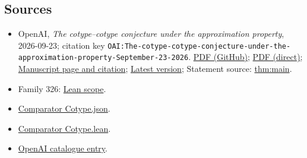 \documentclass[11pt]{article}
\begin{document}
\subsection{Sources}
\begin{itemize}
\item OpenAI, \emph{The cotype–cotype conjecture under the approximation property}, 2026-09-23; citation key \texttt{OAI:The-cotype-cotype-conjecture-under-the-approximation-property-September-23-2026}. \href{https://github.com/openai/math/blob/adc7f1241b42e322a6451854ab7e4b4c146bf78a/preprints/The-cotype-cotype-conjecture-under-the-approximation-property-September-23-2026/paper.pdf}{PDF (GitHub)}; \href{https://github.com/openai/math/raw/adc7f1241b42e322a6451854ab7e4b4c146bf78a/preprints/The-cotype-cotype-conjecture-under-the-approximation-property-September-23-2026/paper.pdf}{PDF (direct)}; \href{https://github.com/openai/math/blob/adc7f1241b42e322a6451854ab7e4b4c146bf78a/preprints/The-cotype-cotype-conjecture-under-the-approximation-property-September-23-2026/README.md}{Manuscript page and citation}; \href{https://github.com/openai/math/blob/main/preprints/The-cotype-cotype-conjecture-under-the-approximation-property-September-23-2026/paper.pdf}{Latest version}; Statement source: \href{https://github.com/openai/math/blob/adc7f1241b42e322a6451854ab7e4b4c146bf78a/preprints/The-cotype-cotype-conjecture-under-the-approximation-property-September-23-2026/build/introduction.tex\#L43}{thm:main}.
\item Family 326: \href{https://github.com/openai/math/blob/adc7f1241b42e322a6451854ab7e4b4c146bf78a/lean/docs/326.md}{Lean scope}.
\item \href{https://github.com/openai/math/blob/adc7f1241b42e322a6451854ab7e4b4c146bf78a/lean/ComparatorChallenges/Cotype.json}{Comparator Cotype.json}.
\item \href{https://github.com/openai/math/blob/adc7f1241b42e322a6451854ab7e4b4c146bf78a/lean/ComparatorChallenges/Cotype.lean}{Comparator Cotype.lean}.
\item \href{https://github.com/openai/math/blob/adc7f1241b42e322a6451854ab7e4b4c146bf78a/CONTENTS.md}{OpenAI catalogue entry}.
\end{itemize}
\end{document}
